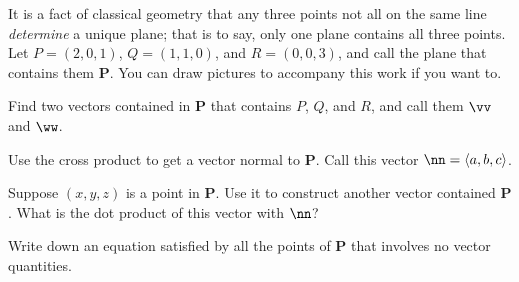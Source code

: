 \documentclass[12pt]{exam}
\theoremstyle{definition}
\begin{document}
\begin{questions}
{It is a fact of classical geometry that any three points not all on the same line \emph{determine} a unique plane; that is to say, only one plane contains all three points. Let $P = (2, 0, 1)$, $Q = (1, 1, 0)$, and $R = (0, 0, 3)$, and call the plane that contains them $\mathbf{P}$. You can draw pictures to accompany this work if you want to.}

\question Find two vectors contained in $\mathbf{P}$ that contains $P$, $Q$, and $R$, and call them $\vv$ and $\ww$.

\question Use the cross product to get a vector normal to $\mathbf{P}$. Call this vector $\nn = \langle a, b, c \rangle$.

\question Suppose $(x, y, z)$ is a point in $\mathbf{P}$. Use it to construct another vector contained $\mathbf{P}$. What is the dot product of this vector with $\nn$?

\question Write down an equation satisfied by all the points of $\mathbf{P}$ that involves no vector quantities.

\end{questions} 
\end{document}
